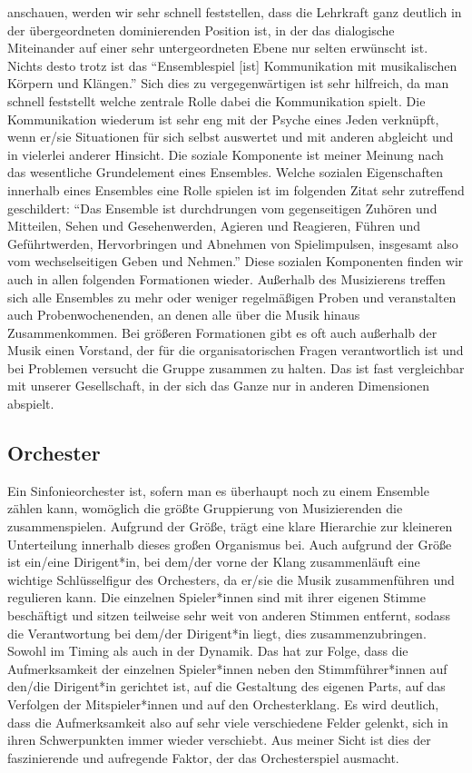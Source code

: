 anschauen, werden wir sehr schnell feststellen, dass die Lehrkraft ganz deutlich
in der übergeordneten dominierenden Position ist, in der das dialogische
Miteinander auf einer sehr untergeordneten Ebene nur selten erwünscht ist.
Nichts desto trotz ist das \enquote{Ensemblespiel [ist] Kommunikation mit
musikalischen Körpern und Klängen.} \autocite[62]{doerne:umfassend_musizieren}
Sich dies zu vergegenwärtigen ist sehr hilfreich, da man schnell feststellt
welche zentrale Rolle dabei die Kommunikation spielt. Die Kommunikation wiederum
ist sehr eng mit der Psyche eines Jeden verknüpft, wenn er/sie Situationen für sich
selbst auswertet und mit anderen abgleicht und in vielerlei anderer Hinsicht.
Die soziale Komponente ist meiner Meinung nach das wesentliche Grundelement
eines Ensembles. Welche sozialen Eigenschaften innerhalb eines Ensembles eine
Rolle spielen ist im folgenden Zitat sehr zutreffend geschildert: \enquote{Das
Ensemble ist durchdrungen vom gegenseitigen Zuhören und Mitteilen, Sehen und
Gesehenwerden, Agieren und Reagieren, Führen und Geführtwerden, Hervorbringen
und Abnehmen von Spielimpulsen, insgesamt also vom wechselseitigen Geben und
Nehmen.} \autocite[62]{doerne:umfassend_musizieren} Diese sozialen Komponenten
finden wir auch in allen folgenden Formationen wieder. Außerhalb des Musizierens
treffen sich alle Ensembles zu mehr oder weniger regelmäßigen Proben und
veranstalten auch Probenwochenenden, an denen alle über die Musik hinaus
Zusammenkommen. Bei größeren Formationen gibt es oft auch außerhalb der Musik
einen Vorstand, der für die organisatorischen Fragen verantwortlich ist und bei
Problemen versucht die Gruppe zusammen zu halten. Das ist fast vergleichbar mit
unserer Gesellschaft, in der sich das Ganze nur in anderen Dimensionen abspielt.



\subsection{Orchester} 

Ein Sinfonieorchester ist, sofern man es überhaupt noch zu einem Ensemble zählen
kann, womöglich die größte Gruppierung von Musizierenden die zusammenspielen.
Aufgrund der Größe, trägt eine klare Hierarchie zur kleineren Unterteilung
innerhalb dieses großen Organismus bei. Auch aufgrund der Größe ist ein/eine
Dirigent*in, bei dem/der vorne der Klang zusammenläuft eine wichtige
Schlüsselfigur des Orchesters, da er/sie die Musik zusammenführen und regulieren
kann. Die einzelnen Spieler*innen sind mit ihrer eigenen Stimme beschäftigt und
sitzen teilweise sehr weit von anderen Stimmen entfernt, sodass die
Verantwortung bei dem/der Dirigent*in liegt, dies zusammenzubringen. Sowohl im
Timing als auch in der Dynamik. Das hat zur Folge, dass die Aufmerksamkeit der
einzelnen Spieler*innen neben den Stimmführer*innen auf den/die Dirigent*in
gerichtet ist, auf die Gestaltung des eigenen Parts, auf das Verfolgen der
Mitspieler*innen und auf den Orchesterklang.
\autocite[56]{doerne:umfassend_musizieren} Es wird deutlich, dass die
Aufmerksamkeit also auf sehr viele verschiedene Felder gelenkt, sich in
ihren Schwerpunkten immer wieder verschiebt. Aus meiner Sicht
ist dies der faszinierende und aufregende Faktor, der das Orchesterspiel
ausmacht. 

